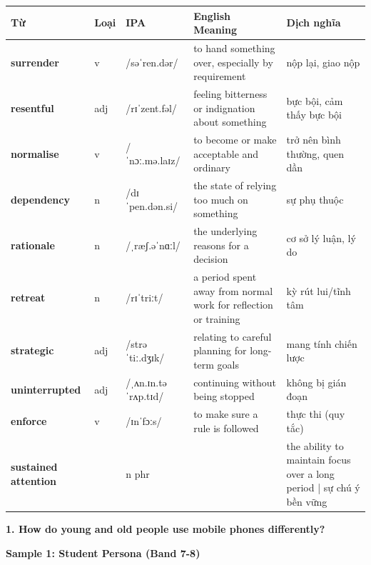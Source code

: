 \vspace{0.8em}
\begin{center}
\renewcommand{\arraystretch}{1.65}
\begin{tabularx}{\textwidth}{|V{0.22\textwidth}|C{0.07\textwidth}|I{0.20\textwidth}|Y|V{0.18\textwidth}|}
\hline
{}
\textbf{Từ} & \textbf{Loại} & \textbf{IPA} & \textbf{English Meaning} & \textbf{Dịch nghĩa} \\
\hline
\textbf{surrender} & v & /səˈren.dər/ & to hand something over, especially by requirement & nộp lại, giao nộp \\ \hline
\textbf{resentful} & adj & /rɪˈzent.fəl/ & feeling bitterness or indignation about something & bực bội, cảm thấy bực bội \\ \hline
\textbf{normalise} & v & /ˈnɔː.mə.laɪz/ & to become or make acceptable and ordinary & trở nên bình thường, quen dần \\ \hline
\textbf{dependency} & n & /dɪˈpen.dən.si/ & the state of relying too much on something & sự phụ thuộc \\ \hline
\textbf{rationale} & n & /ˌræʃ.əˈnɑːl/ & the underlying reasons for a decision & cơ sở lý luận, lý do \\ \hline
\textbf{retreat} & n & /rɪˈtriːt/ & a period spent away from normal work for reflection or training & kỳ rút lui/tĩnh tâm \\ \hline
\textbf{strategic} & adj & /strəˈtiː.dʒɪk/ & relating to careful planning for long-term goals & mang tính chiến lược \\ \hline
\textbf{uninterrupted} & adj & /ˌʌn.ɪn.təˈrʌp.tɪd/ & continuing without being stopped & không bị gián đoạn \\ \hline
\textbf{enforce} & v & /ɪnˈfɔːs/ & to make sure a rule is followed & thực thi (quy tắc) \\ \hline
\textbf{sustained attention} & & n phr & & the ability to maintain focus over a long period | sự chú ý bền vững \\ \hline
\end{tabularx}
\end{center}

\partthreeheader

\begin{ieltsquestion}
\textbf{1. How do young and old people use mobile phones differently?}
\end{ieltsquestion}
\textbf{Sample 1: Student Persona (Band 7-8)}

